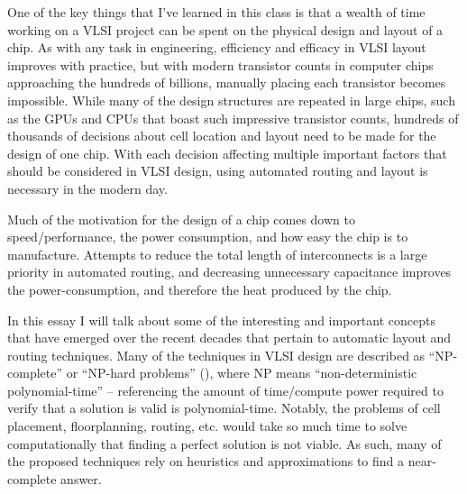 
One of the key things that I've learned in this class
is that a wealth of time working on a VLSI project can
be spent on the physical design and layout of a chip.
As with any task in engineering, efficiency and efficacy
in VLSI layout improves with practice, but with modern
transistor counts in computer chips approaching the
hundreds of billions, manually placing each transistor
becomes impossible. While many of the design structures
are repeated in large chips, such as the GPUs and CPUs
that boast such impressive transistor counts, hundreds
of thousands of decisions about cell location and layout
need to be made for the design of one chip. With each
decision affecting multiple important factors that should
be considered in VLSI design, using automated routing
and layout is necessary in the modern day.

Much of the motivation for the design of a chip comes
down to speed/performance, the power consumption, and
how easy the chip is to manufacture. Attempts to reduce
the total length of interconnects is a large priority
in automated routing, and decreasing unnecessary capacitance
improves the power-consumption, and therefore the heat
produced by the chip.

In this essay I will talk about some of the interesting
and important concepts that have emerged over the recent
decades that pertain to automatic layout and routing
techniques. Many of the techniques in VLSI design are
described as ``NP-complete'' or ``NP-hard problems''
(\cite{9357584}), where NP means ``non-deterministic
polynomial-time'' -- referencing the amount of time/compute
power required to verify that a solution is valid is
polynomial-time. Notably, the problems of cell placement,
floorplanning, routing, etc. would take so much time
to solve computationally that finding a perfect solution
is not viable. As such, many of the proposed techniques
rely on heuristics and approximations to find a near-complete
answer.
